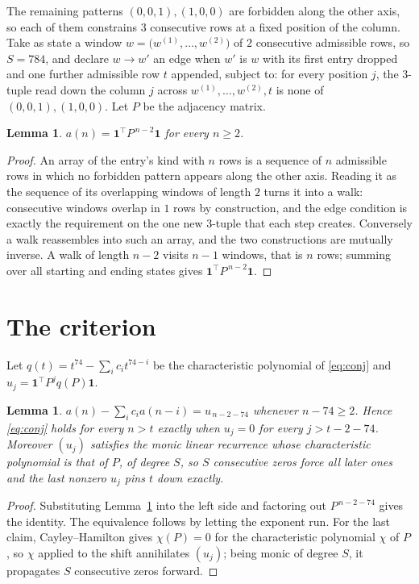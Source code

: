 \documentclass[11pt,a4paper]{article}
\theoremstyle{plain}
\newtheorem{lemma}[theorem]{Lemma}
\theoremstyle{definition}
\begin{document}
The remaining patterns $(0,0,1), (1,0,0)$ are forbidden along the other axis, so each of them
constrains $3$ consecutive rows at a fixed position of the column. Take as state a
window $w=\bigl(w^{(1)},\dots,w^{(2)}\bigr)$ of $2$ consecutive admissible
rows, so $S=784$, and declare $w\to w'$ an edge when $w'$ is $w$ with its first entry
dropped and one further admissible row $t$ appended, subject to: for every position
$j$, the $3$-tuple read down the column $j$ across $w^{(1)},\dots,w^{(2)},t$
is none of $(0,0,1), (1,0,0)$. Let $P$ be the adjacency matrix.

\begin{lemma}\label{lem:walk}
$a(n)=\mathbf{1}^{\!\top}P^{\,n-2}\mathbf{1}$ for every $n\ge2$.
\end{lemma}

\begin{proof}
An array of the entry's kind with $n$ rows is a sequence of $n$ admissible rows in
which no forbidden pattern appears along the other axis. Reading it as the sequence of its
overlapping windows of length $2$ turns it into a walk: consecutive windows overlap in
$1$ rows by construction, and the edge condition is exactly the requirement on the one
new $3$-tuple that each step creates. Conversely a walk reassembles into such an array,
and the two constructions are mutually inverse. A walk of length $n-2$ visits $n-1$
windows, that is $n$ rows; summing over all starting and ending states gives
$\mathbf{1}^{\!\top}P^{\,n-2}\mathbf{1}$.
\end{proof}

\section{The criterion}

Let $q(t)=t^{74}-\sum_i c_i t^{74-i}$ be the characteristic polynomial of
\eqref{eq:conj} and $u_j=\mathbf{1}^{\!\top}P^{j}q(P)\mathbf{1}$.

\begin{lemma}\label{lem:crit}
$a(n)-\sum_i c_i a(n-i)=u_{\,n-2-74}$ whenever $n-74\ge2$. Hence
\eqref{eq:conj} holds for every $n>t$ exactly when $u_j=0$ for every
$j>t-2-74$. Moreover $(u_j)$ satisfies the monic linear recurrence whose
characteristic polynomial is that of $P$, of degree $S$, so $S$ consecutive zeros force all
later ones and the last nonzero $u_j$ pins $t$ down exactly.
\end{lemma}

\begin{proof}
Substituting Lemma~\ref{lem:walk} into the left side and factoring out
$P^{\,n-2-74}$ gives the identity. The equivalence follows by letting the exponent
run. For the last claim, Cayley--Hamilton gives $\chi(P)=0$ for the characteristic
polynomial $\chi$ of $P$, so $\chi$ applied to the shift annihilates $(u_j)$; being monic of
degree $S$, it propagates $S$ consecutive zeros forward.
\end{proof}
\end{document}
